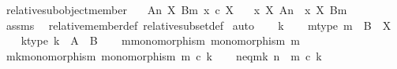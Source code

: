 \begin{isabellebody}
\begin{isamarkuptext}
\end{isamarkuptext}\isamarkuptrue%
\isamarkupfalse%
\ relative{\isacharunderscore}{\kern0pt}subobject{\isacharunderscore}{\kern0pt}member{\isacharcolon}{\kern0pt}\isanewline
\ \ \ {\isachardoublequoteopen}{\isacharparenleft}{\kern0pt}A{\isacharcomma}{\kern0pt}n{\isacharparenright}{\kern0pt}\ {\isasymsubseteq}\isactrlbsub X\isactrlesub \ {\isacharparenleft}{\kern0pt}B{\isacharcomma}{\kern0pt}m{\isacharparenright}{\kern0pt}{\isachardoublequoteclose}\ {\isachardoublequoteopen}x\ {\isasymin}\isactrlsub c\ X{\isachardoublequoteclose}\isanewline
\ \ \ {\isachardoublequoteopen}x\ {\isasymin}\isactrlbsub X\isactrlesub \ {\isacharparenleft}{\kern0pt}A{\isacharcomma}{\kern0pt}n{\isacharparenright}{\kern0pt}\ {\isasymLongrightarrow}\ x\ {\isasymin}\isactrlbsub X\isactrlesub \ {\isacharparenleft}{\kern0pt}B{\isacharcomma}{\kern0pt}m{\isacharparenright}{\kern0pt}{\isachardoublequoteclose}\isanewline
%
\isadelimproof
\ \ %
\endisadelimproof
%
\isatagproof
{}\isamarkupfalse%
\ assms\ \isamarkupfalse%
\ relative{\isacharunderscore}{\kern0pt}member{\isacharunderscore}{\kern0pt}def{}\ relative{\isacharunderscore}{\kern0pt}subset{\isacharunderscore}{\kern0pt}def{}\isanewline
{}\isamarkupfalse%
\ auto\isanewline
\ \ \isamarkupfalse%
\ k\isanewline
\ \ \isamarkupfalse%
\ m{\isacharunderscore}{\kern0pt}type{\isacharcolon}{\kern0pt}\ {\isachardoublequoteopen}m\ {\isacharcolon}{\kern0pt}\ B\ {\isasymrightarrow}\ X{\isachardoublequoteclose}\isanewline
\ \ \isamarkupfalse%
\ k{\isacharunderscore}{\kern0pt}type{\isacharcolon}{\kern0pt}\ {\isachardoublequoteopen}k\ {\isacharcolon}{\kern0pt}\ A\ {\isasymrightarrow}\ B{\isachardoublequoteclose}\isanewline
\ \ \isamarkupfalse%
\ m{\isacharunderscore}{\kern0pt}monomorphism{\isacharcolon}{\kern0pt}\ {\isachardoublequoteopen}monomorphism\ m{\isachardoublequoteclose}\isanewline
\ \ \isamarkupfalse%
\ mk{\isacharunderscore}{\kern0pt}monomorphism{\isacharcolon}{\kern0pt}\ {\isachardoublequoteopen}monomorphism\ {\isacharparenleft}{\kern0pt}m\ {\isasymcirc}\isactrlsub c\ k{\isacharparenright}{\kern0pt}{\isachardoublequoteclose}\isanewline
\ \ \isamarkupfalse%
\ n{\isacharunderscore}{\kern0pt}eq{\isacharunderscore}{\kern0pt}mk{\isacharcolon}{\kern0pt}\ {\isachardoublequoteopen}n\ {\isacharequal}{\kern0pt}\ m\ {\isasymcirc}\isactrlsub c\ k{\isachardoublequoteclose}\isanewline

\end{isabellebody}
